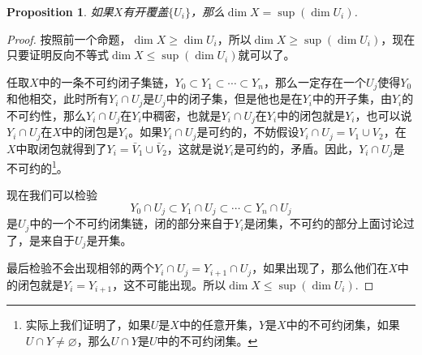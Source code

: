 \documentclass[9pt]{extarticle}
\theoremstyle{plain}%
\newtheorem{pro}[defi]{Proposition}%
\begin{document}
\begin{pro}
如果$X$有开覆盖$\{U_i\}$，那么$\dim X=\sup(\dim U_i)$.
\label{p1.9}
\end{pro}
\begin{proof}
按照前一个命题，$\dim X\geq \dim U_i$，所以$\dim X\geq \sup(\dim U_i)$，现在只要证明反向不等式$\dim X\leq \sup(\dim U_i)$就可以了。

任取$X$中的一条不可约闭子集链，$Y_0\subset Y_1\subset \cdots \subset Y_n$，那么一定存在一个$U_j$使得$Y_0$和他相交，此时所有$Y_i\cap U_j$是$U_j$中的闭子集，但是他也是在$Y_i$中的开子集，由$Y_i$的不可约性，那么$Y_i\cap U_j$在$Y_i$中稠密，也就是$Y_i\cap U_j$在$Y_i$中的闭包就是$Y_i$，也可以说$Y_i\cap U_j$在$X$中的闭包是$Y_i$。如果$Y_i\cap U_j$是可约的，不妨假设$Y_i\cap U_j=V_1\cup V_2$，在$X$中取闭包就得到了$Y_i=\bar{V}_1\cup \bar{V}_2$，这就是说$Y_i$是可约的，矛盾。因此，$Y_i\cap U_j$是不可约的\footnote{实际上我们证明了，如果$U$是$X$中的任意开集，$Y$是$X$中的不可约闭集，如果$U\cap Y\neq \varnothing$，那么$U\cap Y$是$U$中的不可约闭集。}。

现在我们可以检验
\[
	Y_0\cap U_j\subset Y_1\cap U_j\subset \cdots \subset Y_n\cap U_j
\]
是$U_j$中的一个不可约闭集链，闭的部分来自于$Y_i$是闭集，不可约的部分上面讨论过了，是来自于$U_j$是开集。

最后检验不会出现相邻的两个$Y_i\cap U_j=Y_{i+1}\cap U_j$，如果出现了，那么他们在$X$中的闭包就是$Y_i=Y_{i+1}$，这不可能出现。所以$\dim X\leq \sup(\dim U_i)$.
\end{proof}
\end{document}
